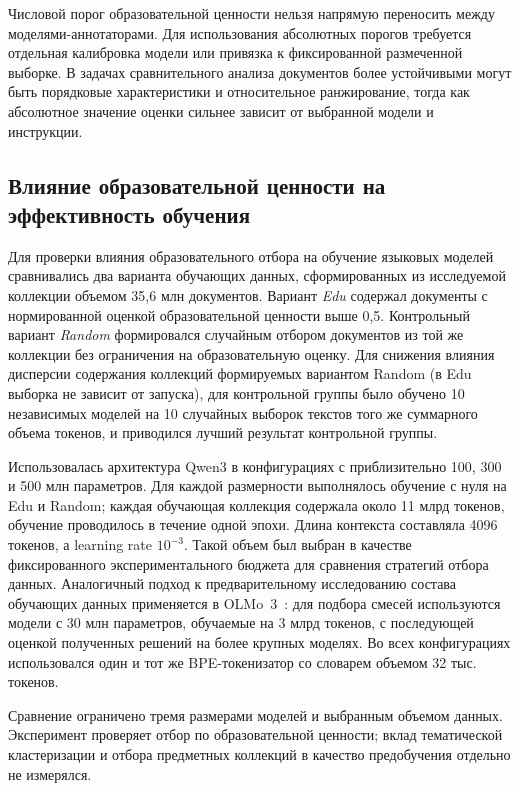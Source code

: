 \documentclass[12pt,a4paper]{article}
\begin{document}
Числовой порог образовательной ценности нельзя напрямую переносить между моделями-аннотаторами.
Для использования абсолютных порогов требуется отдельная калибровка модели 
или привязка к фиксированной размеченной выборке.
В задачах сравнительного анализа документов более устойчивыми могут быть 
порядковые характеристики и относительное ранжирование, тогда как абсолютное 
значение оценки сильнее зависит от выбранной модели и инструкции.


\subsection{Влияние образовательной ценности на эффективность обучения}

Для проверки влияния образовательного отбора на обучение языковых моделей
сравнивались два варианта обучающих данных, сформированных из исследуемой
коллекции объемом 35,6 млн документов. Вариант \textit{Edu} содержал документы
с нормированной оценкой образовательной ценности выше 0,5. Контрольный
вариант \textit{Random} формировался случайным отбором документов из той же
коллекции без ограничения на образовательную оценку. 
Для снижения влияния дисперсии содержания коллекций формируемых вариантом Random 
(в Edu выборка не зависит от запуска), для контрольной группы было обучено 10 независимых моделей на 10 случайных выборок текстов того же суммарного объема токенов, 
и приводился лучший результат контрольной группы.

Использовалась архитектура Qwen3 в конфигурациях с приблизительно 100, 300 и 500 млн параметров.
Для каждой размерности выполнялось обучение с нуля на Edu и Random;
каждая обучающая коллекция содержала около 11 млрд токенов, обучение проводилось в течение одной эпохи.
Длина контекста составляла 4096 токенов, а learning rate $10^{-3}$.
Такой объем был выбран в качестве фиксированного экспериментального бюджета
для сравнения стратегий отбора данных.
Аналогичный подход к предварительному исследованию состава
обучающих данных применяется в OLMo~3~\cite{olmo3}:
для подбора смесей используются модели с 30 млн параметров,
обучаемые на 3 млрд токенов, с последующей оценкой
полученных решений на более крупных моделях.
Во всех конфигурациях использовался один и тот же BPE-токенизатор
со словарем объемом 32 тыс. токенов.

Сравнение ограничено тремя размерами моделей и выбранным объемом данных.
Эксперимент проверяет отбор по образовательной ценности;
вклад тематической кластеризации и отбора предметных коллекций
в качество предобучения отдельно не измерялся.
\end{document}
